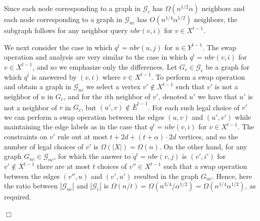 \documentclass{article}
\newcommand{\calG}{{\mathcal{G}}}
\newenvironment{proof}{\smallskip\noindent{\bf Proof:}}%
        {\hspace*{\fill}$\Box$\par}
\begin{document}
\begin{proof}
Since each node  corresponding to a graph in $\calG_c$ has $\Omega(n^{1/2}\alpha)$ neighbors and each node corresponding to a graph in $\calG_{nc}$ has $O(n^{1/4}\alpha^{1/2})$ neighbors, the subgraph follows for any neighbor query $nbr(v,i)$ for $v \in X^{t-1}$.

We next consider the case in which $q^t = nbr(u,j)$ for $u \in Y^{t-1}$. The swap operation and analysis are very similar to the case in which $q^t = nbr(v,i)$ for $v \in X^{t-1}$, and so we emphasize only the differences. Let  $G_c \in \calG_c$ be a graph for which $q^t$ is answered by $(v,i)$ where $v \in X^{t-1}$. To perform a swap operation and obtain a graph in $\calG_{nc}$ we select a vertex $v'\notin X^{t-1}$ such that $v'$ is not a neighbor of $u$ in $G_c$, and for the $i$th neighbor of $v'$, denoted $u'$ we have that
$u'$ is not a neighbor of $v$ in $G_c$, but
$(u',v)\notin \overline{E}^{t-1}$.  For each such legal choice of $v'$ we can perform a swap operation between the edges $(u,v)$ and $(u',v')$ while maintaining the edge labels as in the case that $q^t = nbr(v,i)$ for $v\in X^{t-1}$. The  constraints on $v'$ rule out at most $t+2d + (t+\alpha)\cdot 2d $ vertices, and so the number of legal choices of $v'$ is $\Omega(|X|) = \Omega(n)$. On the other hand, for any graph $G_{nc}\in \calG_{nc}$, for which the answer to $q^t = nbr(v,j)$ is $(v',i')$ for $v'\notin X^{t-1}$ there are at most $t$ choices of $v''\in X^{t-1}$ such that a swap operation between the edges $(v'',u)$ and $(v',u')$ resulted in the graph $G_{nc}$.
Hence, here the ratio between $|\calG_{nc}|$ and $|\calG_c|$ is $\Omega(n/t) = \Omega(n^{3/4}/\alpha^{1/2}) = \Omega(n^{1/4}\alpha^{1/2})$, as required.


\end{proof}
\end{document}
